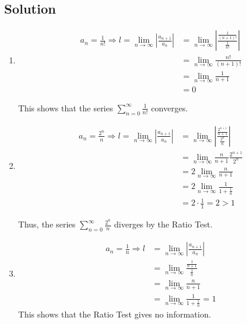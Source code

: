 \documentclass[11pt]{article}
\begin{document}
\subsection{Solution}
\begin{enumerate}[ (a) ]
\item 
\begin{align*}
a_n = \frac{1}{n!} \Rightarrow l =  \lim_{n\rightarrow\infty} \left| \frac{a_{n+1}}{a_n}\right| &= \lim_{n\rightarrow\infty} \left| \frac{\frac{1}{(n+1)!}}{\frac{1}{n!}}\right| \\
&= \lim_{n\rightarrow\infty} \frac{n!}{(n+1)!} \\
&= \lim_{n\rightarrow\infty} \frac{1}{n+1} \\
&= 0
\end{align*}

This shows that the series $\displaystyle{\sum_{n=0}^\infty \frac{1}{n!}}$ converges.

\item
\begin{align*}
a_n = \frac{2^n}{n} \Rightarrow l = \lim_{n\rightarrow\infty} \left| \frac{a_{n+1}}{a_n}\right| &= \lim_{n\rightarrow\infty} \left| \frac{\frac{2^{n+1}}{n+1}}{\frac{2^n}{n}}\right| \\
&= \lim_{n\rightarrow\infty} \frac{n}{n+1} \frac{2^{n+1}}{2^n} \\
&= 2 \lim_{n\rightarrow\infty} \frac{n}{n+1} \\
&= 2 \lim_{n\rightarrow\infty} \frac{1}{1+\frac{1}{n}} \\
&= 2 \cdot \frac{1}{1} = 2 > 1
\end{align*}

Thus, the series $\displaystyle{\sum_{n=0}^\infty \frac{2^n}{n}}$ diverges by the Ratio Test.

\item
\begin{align*}
a_n = \frac{1}{n} \Rightarrow l &= \lim_{n\rightarrow\infty} \left| \frac{a_{n+1}}{a_n}\right| \\
&= \lim_{n\rightarrow\infty} \frac{\frac{1}{n+1}}{\frac{1}{n}} \\
&= \lim_{n\rightarrow\infty} \frac{n}{n+1} \\
&=  \lim_{n\rightarrow\infty} \frac{1}{1 + \frac{1}{n}} = 1
\end{align*}
This shows that the Ratio Test gives no information.
\end{enumerate}
\end{document}
